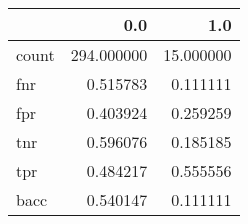 \begin{tabular}{lrr}
\toprule
{} &         0.0 &        1.0 \\
\midrule
count &  294.000000 &  15.000000 \\
fnr   &    0.515783 &   0.111111 \\
fpr   &    0.403924 &   0.259259 \\
tnr   &    0.596076 &   0.185185 \\
tpr   &    0.484217 &   0.555556 \\
bacc  &    0.540147 &   0.111111 \\
\bottomrule
\end{tabular}
